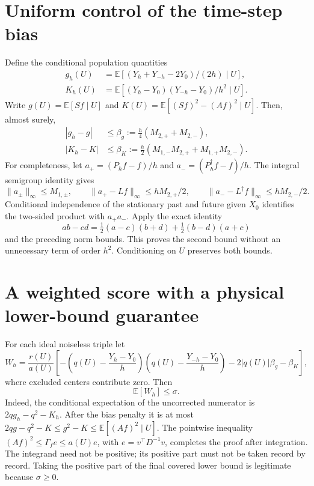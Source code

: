 \section{Uniform control of the time-step bias}
Define the conditional population quantities
\begin{align}
 g_h(U)&=\mathbb E[(Y_h+Y_{-h}-2Y_0)/(2h)\mid U],\\
 K_h(U)&=\mathbb E[(Y_h-Y_0)(Y_{-h}-Y_0)/h^2\mid U].
\end{align}
Write $g(U)=\mathbb E[Sf\mid U]$ and
$K(U)=\mathbb E[(Sf)^2-(Af)^2\mid U]$. Then, almost surely,
\begin{align}
 |g_h-g|&\le\beta_g:=\frac h4(M_{2,+}+M_{2,-}),\\
 |K_h-K|&\le\beta_K:=
 \frac h2(M_{1,-}M_{2,+}+M_{1,+}M_{2,-}).
 \label{eq:og-finite-bias}
\end{align}
For completeness, let
$a_+=(P_hf-f)/h$ and $a_-=(P_h^\dagger f-f)/h$.
The integral semigroup identity gives
\begin{equation}
 \|a_\pm\|_\infty\le M_{1,\pm},\qquad
 \|a_+-Lf\|_\infty\le hM_{2,+}/2,\qquad
 \|a_--L^\dagger f\|_\infty\le hM_{2,-}/2.
\end{equation}
Conditional independence of the stationary past and future given $X_0$
identifies the two-sided product with $a_+a_-$. Apply the exact identity
\begin{equation}
 ab-cd=\tfrac12(a-c)(b+d)+\tfrac12(b-d)(a+c)
\end{equation}
and the preceding norm bounds. This proves the second bound without an
unnecessary term of order $h^2$. Conditioning on $U$ preserves both bounds.

\section{A weighted score with a physical lower-bound guarantee}
For each ideal noiseless triple let
\begin{equation}
 W_h=\frac{r(U)}{a(U)}
 \left[-\left(q(U)-\frac{Y_h-Y_0}{h}\right)
          \left(q(U)-\frac{Y_{-h}-Y_0}{h}\right)
       -2|q(U)|\beta_g-\beta_K\right],
 \label{eq:og-finite-score}
\end{equation}
where excluded centers contribute zero. Then
\begin{equation}
 \mathbb E[W_h]\le\sigma.
 \label{eq:og-finite-main}
\end{equation}
Indeed, the conditional expectation of the uncorrected numerator is
$2qg_h-q^2-K_h$. After the bias penalty it is at most
$2qg-q^2-K\le g^2-K\le\mathbb E[(Af)^2\mid U]$.
The pointwise inequality
$(Af)^2\le\Gamma_f e\le a(U)e$, with
$e=v^\top D^{-1}v$, completes the proof after integration. The integrand
need not be positive; its positive part must not be taken record by record.
Taking the positive part of the final covered lower bound is legitimate
because $\sigma\ge0$.

